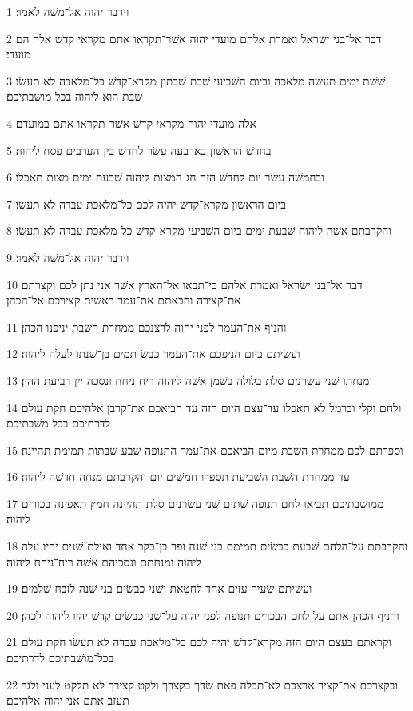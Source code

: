 \par 1 וידבר יהוה אל־משׁה לאמר׃
\par 2 דבר אל־בני ישׂראל ואמרת אלהם מועדי יהוה אשׁר־תקראו אתם מקראי קדשׁ אלה הם מועדי׃
\par 3 שׁשׁת ימים תעשׂה מלאכה וביום השׁביעי שׁבת שׁבתון מקרא־קדשׁ כל־מלאכה לא תעשׂו שׁבת הוא ליהוה בכל מושׁבתיכם׃
\par 4 אלה מועדי יהוה מקראי קדשׁ אשׁר־תקראו אתם במועדם׃
\par 5 בחדשׁ הראשׁון בארבעה עשׂר לחדשׁ בין הערבים פסח ליהוה׃
\par 6 ובחמשׁה עשׂר יום לחדשׁ הזה חג המצות ליהוה שׁבעת ימים מצות תאכלו׃
\par 7 ביום הראשׁון מקרא־קדשׁ יהיה לכם כל־מלאכת עבדה לא תעשׂו׃
\par 8 והקרבתם אשׁה ליהוה שׁבעת ימים ביום השׁביעי מקרא־קדשׁ כל־מלאכת עבדה לא תעשׂו׃
\par 9 וידבר יהוה אל־משׁה לאמר׃
\par 10 דבר אל־בני ישׂראל ואמרת אלהם כי־תבאו אל־הארץ אשׁר אני נתן לכם וקצרתם את־קצירה והבאתם את־עמר ראשׁית קצירכם אל־הכהן׃
\par 11 והניף את־העמר לפני יהוה לרצנכם ממחרת השׁבת יניפנו הכהן׃
\par 12 ועשׂיתם ביום הניפכם את־העמר כבשׂ תמים בן־שׁנתו לעלה ליהוה׃
\par 13 ומנחתו שׁני עשׂרנים סלת בלולה בשׁמן אשׁה ליהוה ריח ניחח ונסכה יין רביעת ההין׃
\par 14 ולחם וקלי וכרמל לא תאכלו עד־עצם היום הזה עד הביאכם את־קרבן אלהיכם חקת עולם לדרתיכם בכל משׁבתיכם׃
\par 15 וספרתם לכם ממחרת השׁבת מיום הביאכם את־עמר התנופה שׁבע שׁבתות תמימת תהיינה׃
\par 16 עד ממחרת השׁבת השׁביעת תספרו חמשׁים יום והקרבתם מנחה חדשׁה ליהוה׃
\par 17 ממושׁבתיכם תביאו לחם תנופה שׁתים שׁני עשׂרנים סלת תהיינה חמץ תאפינה בכורים ליהוה׃
\par 18 והקרבתם על־הלחם שׁבעת כבשׂים תמימם בני שׁנה ופר בן־בקר אחד ואילם שׁנים יהיו עלה ליהוה ומנחתם ונסכיהם אשׁה ריח־ניחח ליהוה׃
\par 19 ועשׂיתם שׂעיר־עזים אחד לחטאת ושׁני כבשׂים בני שׁנה לזבח שׁלמים׃
\par 20 והניף הכהן אתם על לחם הבכרים תנופה לפני יהוה על־שׁני כבשׂים קדשׁ יהיו ליהוה לכהן׃
\par 21 וקראתם בעצם היום הזה מקרא־קדשׁ יהיה לכם כל־מלאכת עבדה לא תעשׂו חקת עולם בכל־מושׁבתיכם לדרתיכם׃
\par 22 ובקצרכם את־קציר ארצכם לא־תכלה פאת שׂדך בקצרך ולקט קצירך לא תלקט לעני ולגר תעזב אתם אני יהוה אלהיכם׃
